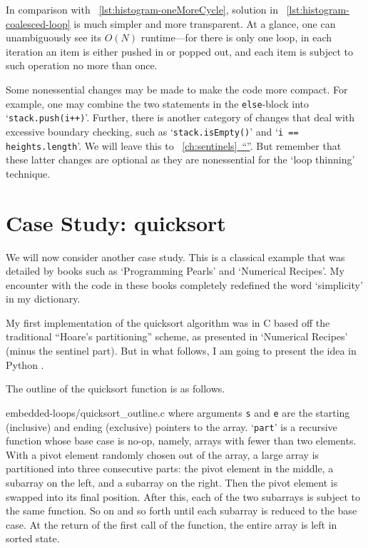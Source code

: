 \documentclass[oneside,11pt]{book}
\theoremstyle{definition}
\theoremstyle{remark}
\newcommand{\code}[1]{\mbox{\lstinline{#1}}}
\newcommand{\python}{Python }
\newcommand*{\fullref}[1]{\hyperref[{#1}]{\mbox{\autoref*{#1}~}``\nameref*{#1}''}}
\begin{document}
In comparison with ~\autoref{lst:histogram-oneMoreCycle}, solution in
~\autoref{lst:histogram-coalesced-loop} is much simpler and more transparent.
At a glance, one can unambiguously see its $O(N)$ runtime---for there is only one loop,
in each iteration an item is either pushed in or popped out,
and each item is subject to such operation no more than once.


Some nonessential changes may be made to make the code more compact.
For example, one may combine the two statements in the \code{else}-block into
`\code{stack.push(i++)}'.
Further, there is another category of changes that deal with excessive boundary checking,
such as
`\code{stack.isEmpty()}' and `\code{i == heights.length}'.
We will leave this to ~\fullref{ch:sentinels}.
But remember that these latter changes are optional
as they are nonessential for the `loop thinning' technique.


\section{Case Study: quicksort}\label{sec:nested-loop-quick-sort}

We will now consider another case study.
This is a classical example that was detailed by books such as `Programming
Pearls' and `Numerical Recipes'\cite{Bentley:1986:PP, NumericalRecipes:1992}.
My encounter with the code in these books completely redefined the word `simplicity'
in my dictionary.


My first implementation of the quicksort algorithm was in C based off
the traditional ``Hoare's partitioning'' scheme, as presented
in `Numerical Recipes' (minus the sentinel part).
But in what follows, I am going to present the idea in \python.


The outline of the quicksort function is as follows.

{embedded-loops/quicksort_outline.c}
where arguments \code{s} and \code{e} are the starting (inclusive) and ending (exclusive) pointers
to the array.
`\code{part}' is a recursive function whose base case is no-op, namely,
arrays with fewer than two elements.
With a pivot element randomly chosen out of the array,
a large array is partitioned into three consecutive parts: the pivot element in the middle, a
subarray on the left, and a subarray on the right.
Then the pivot element is swapped into its final position.
After this, each of the two subarrays is subject to the same function.
So on and so forth until each subarray is reduced to the base case.
At the return of the first call of the function, the entire array is left in sorted state.
\end{document}
